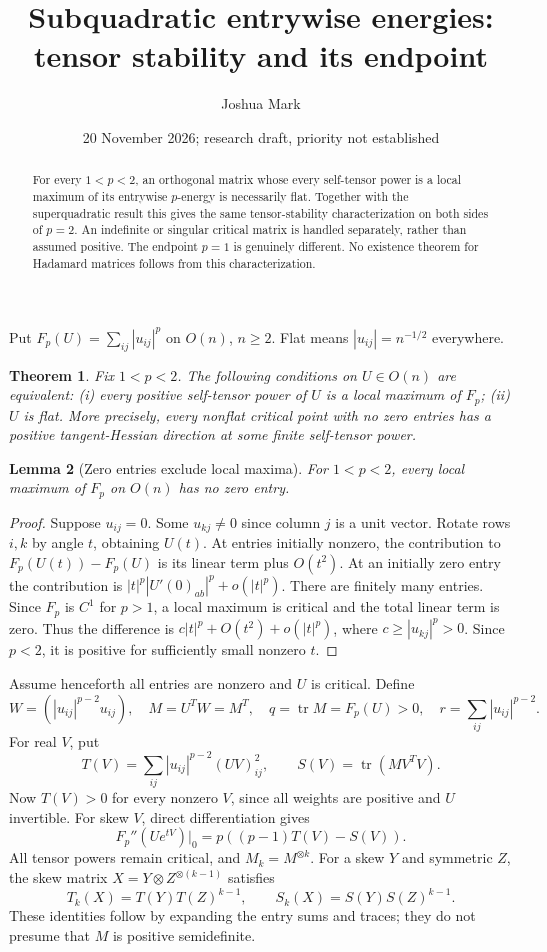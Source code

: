 \documentclass[11pt]{article}
\title{Subquadratic entrywise energies: tensor stability and its endpoint}
\author{Joshua Mark}
\date{20 November 2026; research draft, priority not established}
\newtheorem{theorem}{Theorem}
\newtheorem{lemma}[theorem]{Lemma}
\newcommand{\tr}{\operatorname{tr}}
\begin{document}
\maketitle
\begin{abstract}
For every $1<p<2$, an orthogonal matrix whose every self-tensor power is
a local maximum of its entrywise $p$-energy is necessarily flat. Together
with the superquadratic result this gives the same tensor-stability
characterization on both sides of $p=2$. An indefinite or singular
critical matrix is handled separately, rather than assumed positive.
The endpoint $p=1$ is genuinely different. No existence theorem for
Hadamard matrices follows from this characterization.
\end{abstract}

Put $F_p(U)=\sum_{ij}|u_{ij}|^p$ on $O(n)$, $n\ge2$. Flat means
$|u_{ij}|=n^{-1/2}$ everywhere.
\begin{theorem}\label{main}
Fix $1<p<2$. The following conditions on $U\in O(n)$ are equivalent:
(i) every positive self-tensor power of $U$ is a local maximum of $F_p$;
(ii) $U$ is flat.
More precisely, every nonflat critical point with no zero entries has
a positive tangent-Hessian direction at some finite self-tensor power.
\end{theorem}

\begin{lemma}[Zero entries exclude local maxima]\label{zeros}
For $1<p<2$, every local maximum of $F_p$ on $O(n)$ has no zero entry.
\end{lemma}
\begin{proof}
Suppose $u_{ij}=0$. Some $u_{kj}\ne0$ since column $j$ is a unit vector.
Rotate rows $i,k$ by angle $t$, obtaining $U(t)$. At entries initially
nonzero, the contribution to $F_p(U(t))-F_p(U)$ is its linear term plus
$O(t^2)$. At an initially zero entry the contribution is
$|t|^p|U'(0)_{ab}|^p+o(|t|^p)$. There are finitely many entries.
Since $F_p$ is $C^1$ for $p>1$, a local maximum is critical and the
total linear term is zero. Thus the difference is
$c|t|^p+O(t^2)+o(|t|^p)$, where $c\ge |u_{kj}|^p>0$.
Since $p<2$, it is positive for sufficiently small nonzero $t$.
\end{proof}

Assume henceforth all entries are nonzero and $U$ is critical. Define
\[
 W=(|u_{ij}|^{p-2}u_{ij}),\quad M=U^TW=M^T,\quad
 q=\tr M=F_p(U)>0,\quad r=\sum_{ij}|u_{ij}|^{p-2}.
\]
For real $V$, put
\[
 T(V)=\sum_{ij}|u_{ij}|^{p-2}(UV)_{ij}^2,\qquad
 S(V)=\tr(MV^TV).
\]
Now $T(V)>0$ for every nonzero $V$, since all weights are positive and
$U$ invertible. For skew $V$, direct differentiation gives
\begin{equation}\label{hess}
 F_p''(Ue^{tV})|_0=p((p-1)T(V)-S(V)).
\end{equation}
All tensor powers remain critical, and $M_k=M^{\otimes k}$. For a
skew $Y$ and symmetric $Z$, the skew matrix
$X=Y\otimes Z^{\otimes(k-1)}$ satisfies
\begin{equation}\label{factor}
 T_k(X)=T(Y)T(Z)^{k-1},\qquad S_k(X)=S(Y)S(Z)^{k-1}.
\end{equation}
These identities follow by expanding the entry sums and traces; they
do not presume that $M$ is positive semidefinite.
\end{document}
